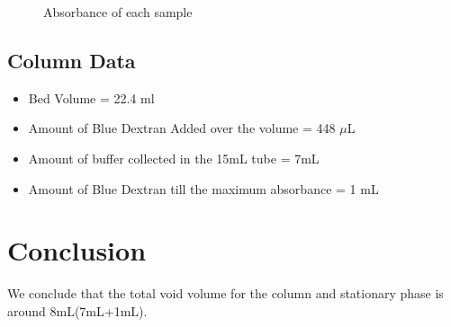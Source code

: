 \documentclass{article}
\begin{document}
    \begin{figure}
        \centering
        \caption{Absorbance of each sample}
    \end{figure}
    \newpage
    \subsection{Column Data}
    \begin{itemize}
        \item Bed Volume = 22.4 ml
        \item Amount of Blue Dextran Added over the volume = 448 $\mu$L
        \item Amount of buffer collected in the 15mL tube = 7mL
        \item Amount of Blue Dextran till the maximum absorbance = 1 mL
    \end{itemize}
    \section{Conclusion}
    We conclude that the total void volume for the column and stationary phase is around 8mL(7mL+1mL).
\end{document}
